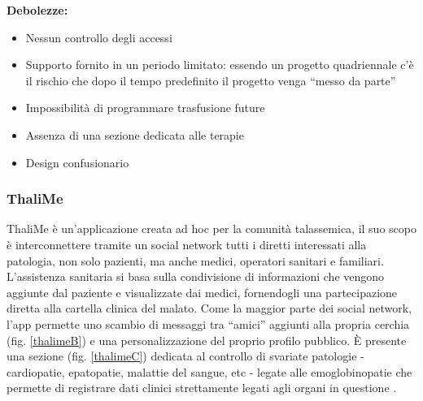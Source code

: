 \documentclass[12pt,a4paper,openright,twoside]{report}
\begin{document}
\textbf{Debolezze:}
\begin{itemize}
    \item Nessun controllo degli accessi
    \item Supporto fornito in un periodo limitato: essendo un progetto quadriennale c'è il rischio che dopo il tempo predefinito il progetto venga ``messo da parte''
    \item Impossibilità di programmare trasfusione future
    \item Assenza di una sezione dedicata alle terapie
    \item Design confusionario
\end{itemize}

\subsubsection{ThaliMe}
ThaliMe è un'applicazione creata ad hoc per la comunità talassemica, il suo scopo è interconnettere tramite un social network tutti i diretti interessati alla patologia, non solo pazienti, ma anche medici, operatori sanitari e familiari. L'assistenza sanitaria si basa sulla condivisione di informazioni che vengono aggiunte dal paziente e visualizzate dai medici, fornendogli una partecipazione diretta alla cartella clinica del malato.
Come la maggior parte dei social network, l'app permette uno scambio di messaggi tra ``amici'' aggiunti alla propria cerchia (fig. \ref{thalimeB}) e una personalizzazione del proprio profilo pubblico.
\`E presente una sezione (fig. \ref{thalimeC}) dedicata al controllo di svariate patologie - cardiopatie, epatopatie, malattie del sangue, etc - legate alle emoglobinopatie che permette di registrare dati clinici strettamente legati agli organi in questione \cite{mcmicking2018thalime}.
\end{document}
